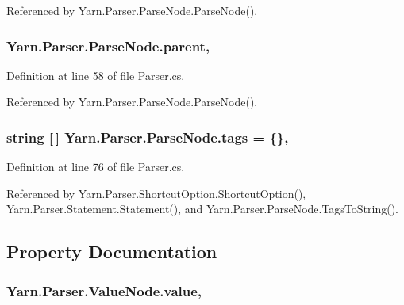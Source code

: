 Referenced by Yarn.\-Parser.\-Parse\-Node.\-Parse\-Node().

\hypertarget{a00138_af313a82103fcc2ff5a177dbb06b92f7b}{
\subsubsection[{parent}]{ Yarn.\-Parser.\-Parse\-Node.\-parent\hspace{0.3cm}{\ttfamily [package]}, {\ttfamily [inherited]}}}\label{a00138_af313a82103fcc2ff5a177dbb06b92f7b}


Definition at line 58 of file Parser.\-cs.



Referenced by Yarn.\-Parser.\-Parse\-Node.\-Parse\-Node().

\hypertarget{a00138_a58b3a15788fd2d4127d73619dc6d04ae}{
\subsubsection[{tags}]{\setlength{\rightskip}{0pt plus 5cm}string \mbox{[}$\,$\mbox{]} Yarn.\-Parser.\-Parse\-Node.\-tags = \{\}\hspace{0.3cm}{\ttfamily [package]}, {\ttfamily [inherited]}}}\label{a00138_a58b3a15788fd2d4127d73619dc6d04ae}


Definition at line 76 of file Parser.\-cs.



Referenced by Yarn.\-Parser.\-Shortcut\-Option.\-Shortcut\-Option(), Yarn.\-Parser.\-Statement.\-Statement(), and Yarn.\-Parser.\-Parse\-Node.\-Tags\-To\-String().



\subsection{Property Documentation}
\hypertarget{a00178_a51ab5939344f9bfa21181c02cf0e341d}{
\subsubsection[{value}]{ Yarn.\-Parser.\-Value\-Node.\-value\hspace{0.3cm}{\ttfamily [get]}, {\ttfamily [set]}}}\label{a00178_a51ab5939344f9bfa21181c02cf0e341d}



